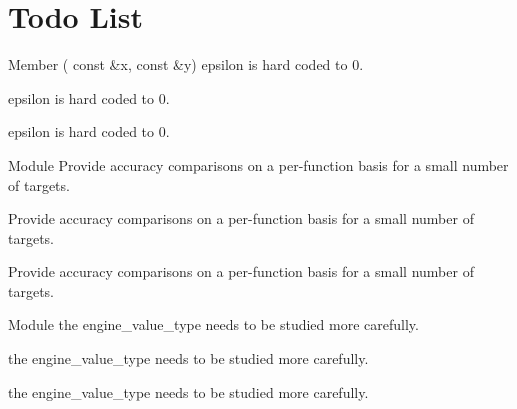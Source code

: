 \chapter{Todo List}
\hypertarget{todo}{}\label{todo}

\begin{DoxyRefList}
\item[Member \doxylink{group__gtx__vector__angle_ga9556a803dce87fe0f42fdabe4ebba1d5}{glm\+::oriented\+Angle} (\doxylink{structglm_1_1vec_3_012_00_01_t_00_01_q_01_4}{vec$<$ 2, T, Q $>$} const \&x, \doxylink{structglm_1_1vec_3_012_00_01_t_00_01_q_01_4}{vec$<$ 2, T, Q $>$} const \&y)]\label{todo__todo000001}%
%
epsilon is hard coded to 0. 

\label{todo__todo000005}%
%
epsilon is hard coded to 0. 

\label{todo__todo000009}%
%
epsilon is hard coded to 0.  
\item[Module \doxylink{group__mathsf}{mathsf} ]\label{todo__todo000003}%
%
Provide accuracy comparisons on a per-\/function basis for a small number of targets.

\label{todo__todo000007}%
%
Provide accuracy comparisons on a per-\/function basis for a small number of targets.

\label{todo__todo000011}%
%
Provide accuracy comparisons on a per-\/function basis for a small number of targets. 
\item[Module \doxylink{group__tr1__random__generators}{tr1\+\_\+random\+\_\+generators} ]\label{todo__todo000004}%
%
the engine\+\_\+value\+\_\+type needs to be studied more carefully. 

\label{todo__todo000008}%
%
the engine\+\_\+value\+\_\+type needs to be studied more carefully. 

\label{todo__todo000012}%
%
the engine\+\_\+value\+\_\+type needs to be studied more carefully. 
\end{DoxyRefList}